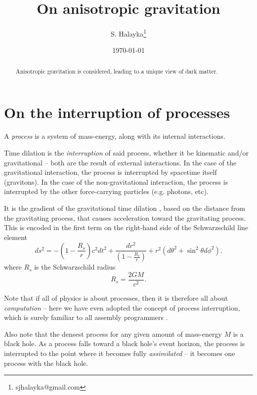 \documentclass[12pt]{article}
\title{On anisotropic gravitation}
\author{S. Halayka\footnote{sjhalayka@gmail.com}}
\date{\today}
\begin{document}
 
\maketitle

\begin{abstract}
Anisotropic gravitation is considered, leading to a unique view of dark matter.
\end{abstract}






\section{On the interruption of processes}

A {\textit{process}} is a system of mass-energy, along with its internal interactions.

Time dilation is the {\textit{interruption}} of said process, whether it be kinematic and/or gravitational -- both are the result of external interactions.
In the case of the gravitational interaction, the process is interrupted by spacetime itself (gravitons).
In the case of the non-gravitational interaction, the process is interrupted by the other force-carrying particles (e.g. photons, etc).

It is the gradient of the gravitational time dilation \cite{misner}, based on the distance from the gravitating process, that causes acceleration toward the gravitating process.
This is encoded in the first term on the right-hand side of the Schwarzschild line element
\begin{equation}
ds^2 = -\left( 1 - \frac{R_s}{r} \right) c^2 dt^2 + \frac{dr^2}{\left( 1 - \frac{R_s}{r} \right)} + r^2 (d\theta^2 + \sin^2 \theta d\phi^2).
\end{equation}
where $R_s$ is the Schwarzschild radius
\begin{equation}
R_s = \frac{2GM}{c^2}.
\end{equation}

Note that if all of physics is about processes, then it is therefore all about {\textit{computation}} -- here we have even adopted the concept of process interruption, which is surely familiar to all assembly programmers \cite{abrash}.

Also note that the densest process for any given amount of mass-energy $M$ is a black hole.
As a process falls toward a black hole's event horizon, the process is interrupted to the point where it becomes fully {\textit{assimilated}} -- it becomes one process with the black hole.
\end{document}
